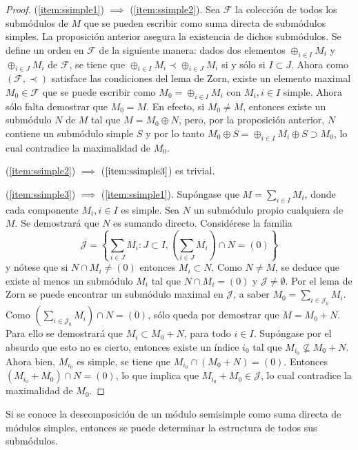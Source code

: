\begin{proof}
(\ref{item:ssimple1}) $\implies$ (\ref{item:ssimple2}). Sea $\mathcal{F}$ la colección de todos los submódulos de $M$ que se pueden escribir como suma directa de submódulos simples. La proposición anterior asegura la existencia de dichos submódulos. Se define un orden en $\mathcal{F}$ de la siguiente manera: dados dos elementos $\oplus_{i \in I}M_i$ y $\oplus_{i \in J}M_i$ de $\mathcal{F}$, se tiene que $\oplus_{i \in I}M_i  \prec \oplus_{i \in J}M_i$ si y sólo si $I \subset J$. 
Ahora como $(\mathcal{F, \prec})$ satisface las condiciones del lema de Zorn, existe un elemento maximal $M_0 \in \mathcal{F}$ que se puede escribir como $M_0 = \oplus_{i \in I}M_i$ con $M_i, i \in I$ simple.
Ahora sólo falta demostrar que $M_0 = M$. En efecto, si $M_0 \neq M$, entonces existe un submódulo $N$ de $M$ tal que $M = M_0 \oplus N$, pero, por la proposición anterior, $N$ contiene un submódulo simple $S$ y por lo tanto $M_0 \oplus S = \oplus_{i \in I}M_i \oplus S \supset M_0$, lo cual contradice la maximalidad de $M_0$.

(\ref{item:ssimple2}) $\implies$ ($\ref{item:ssimple3}$) es trivial.

(\ref{item:ssimple3}) $\implies$ (\ref{item:ssimple1}). Supóngase que $M = \sum_{i \in I}M_i$, donde cada componente $M_i, i \in I$ es simple. Sea $N$ un submódulo propio cualquiera de $M$. Se demostrará que $N$ es sumando directo. 
Considérese la familia \[ \mathcal{J} = \left\{ \sum_{i \in J} M_i \colon J \subset I, \left(\sum_{i \in J}M_i \right) \cap N = (0)  \right\} \] y nótese que si $N \cap M_i \neq (0)$ entonces $M_i \subset N$. Como $N \neq M$, se deduce que existe al menos un submódulo $M_i$ tal que $N \cap M_i = (0)$ y $\mathcal{J} \neq \emptyset$. Por el lema de Zorn se puede encontrar un submódulo maximal en $\mathcal{J}$, a saber $M_0 = \sum_{i \in \mathcal{J}_0}M_i$. Como $\left( \sum_{i \in \mathcal{J}_0}M_i  \right) \cap N = (0)$, sólo queda por demostrar que $M = M_0 + N$. Para ello se demostrará que $M_i \subset M_0 + N$, para todo $i \in I$. Supóngase por el absurdo que esto no es cierto, entonces existe un índice $i_{0}$ tal que $M_{i_0} \nsubseteq M_0 + N $. Ahora bien, $M_{i_0}$ es simple, se tiene que $M_{i_0} \cap (M_0 + N) = (0)$. Entonces $(M_{i_0} + M_0)\cap N =(0)$, lo que implica que $M_{i_0} + M_0 \in \mathcal{J}$, lo cual contradice la maximalidad de $M_0$.
\end{proof}
Si se conoce la descomposición de un módulo semisimple como suma directa de módulos simples, entonces se puede determinar la estructura de todos sus submódulos. 
